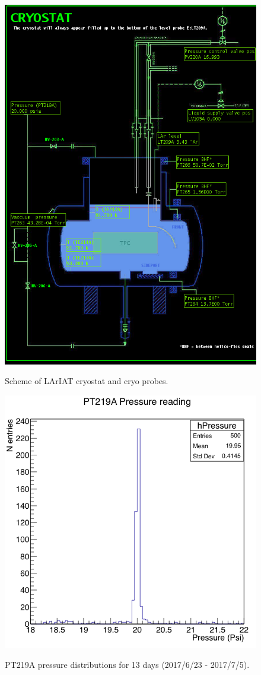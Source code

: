 \begin{figure}[ht!]
\centering
\includegraphics[scale=0.45]{./images/cryopic.png}\\
\caption{Scheme of LArIAT cryostat and cryo probes.}
\label{fig:cryo}
\end{figure}


\begin{figure}[ht!]
\centering
\includegraphics[scale=0.45]{./images/Pressure.png}\\
\caption{PT219A pressure distributions for 13 days (2017/6/23 - 2017/7/5).}
\label{fig:pressure}
\end{figure}





